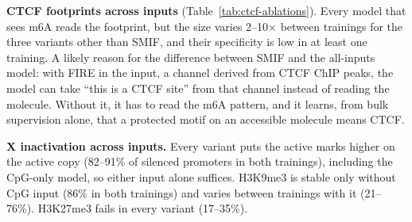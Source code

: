 \documentclass[acmtog,nonacm]{acmart}   %
\begin{document}
\textbf{CTCF footprints across inputs} (Table~\ref{tab:ctcf-ablations}). Every model that sees m6A reads the
footprint, but the size varies 2--10$\times$ between trainings for the three variants other than SMIF, and their
specificity is low in at least one training. A likely reason for the difference between SMIF and the all-inputs
model: with FIRE in the input, a channel derived from CTCF ChIP peaks, the model can take ``this is a CTCF site''
from that channel instead of reading the molecule. Without it, it has to read the m6A pattern, and it learns, from
bulk supervision alone, that a protected motif on an accessible molecule means CTCF.

\textbf{X inactivation across inputs.} Every variant puts the active marks higher on the active copy (82--91\% of
silenced promoters in both trainings), including the CpG-only model, so either input alone suffices. H3K9me3 is
stable only without CpG input (86\% in both trainings) and varies between trainings with it (21--76\%). H3K27me3
fails in every variant (17--35\%).
\end{document}
